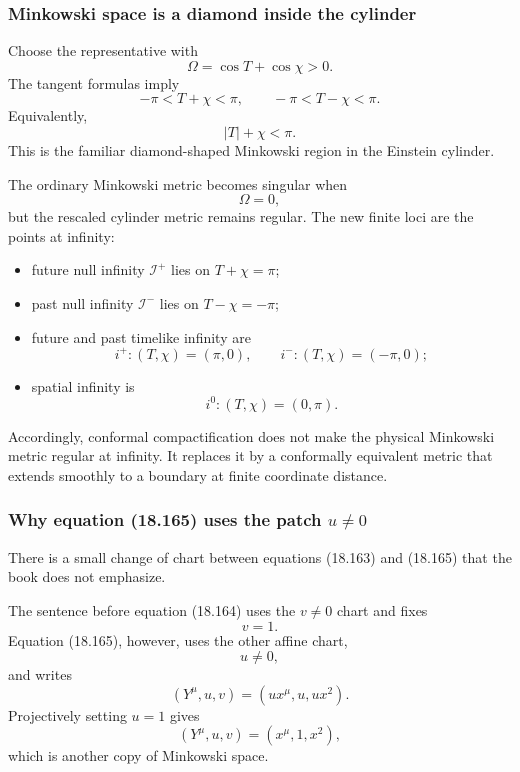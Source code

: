 \documentclass[
  10pt,
  a4paper,
  openany]{book}
\providecommand{\tightlist}{%
  \setlength{\itemsep}{0pt}\setlength{\parskip}{0pt}}
\begin{document}
\subsubsection{Minkowski space is a diamond inside the
cylinder}\label{minkowski-space-is-a-diamond-inside-the-cylinder}

Choose the representative with \[
\Omega=\cos T+\cos\chi>0.
\] The tangent formulas imply \[
-\pi<T+\chi<\pi,
\qquad
-\pi<T-\chi<\pi.
\] Equivalently, \[
\boxed{
|T|+\chi<\pi
}.
\] This is the familiar diamond-shaped Minkowski region in the Einstein
cylinder.

The ordinary Minkowski metric becomes singular when \[
\Omega=0,
\] but the rescaled cylinder metric remains regular. The new finite loci
are the points at infinity:

\begin{itemize}
\tightlist
\item
  future null infinity \(\mathscr I^+\) lies on \(T+\chi=\pi\);
\item
  past null infinity \(\mathscr I^-\) lies on \(T-\chi=-\pi\);
\item
  future and past timelike infinity are \[
  i^+:(T,\chi)=(\pi,0),
  \qquad
  i^-:(T,\chi)=(-\pi,0);
  \]
\item
  spatial infinity is \[
  i^0:(T,\chi)=(0,\pi).
  \]
\end{itemize}

Accordingly, conformal compactification does not make the physical
Minkowski metric regular at infinity. It replaces it by a conformally
equivalent metric that extends smoothly to a boundary at finite
coordinate distance.

\subsubsection{\texorpdfstring{Why equation (18.165) uses the patch
\(u\neq0\)}{Why equation (18.165) uses the patch u\textbackslash neq0}}\label{why-equation-18.165-uses-the-patch-uneq0}

There is a small change of chart between equations (18.163) and (18.165)
that the book does not emphasize.

The sentence before equation (18.164) uses the \(v\neq0\) chart and
fixes \[
v=1.
\] Equation (18.165), however, uses the other affine chart, \[
u\neq0,
\] and writes \[
\left(
Y^\mu,u,v
\right)
=
\left(
u x^\mu,u,ux^2
\right).
\] Projectively setting \(u=1\) gives \[
\left(
Y^\mu,u,v
\right)
=
\left(
x^\mu,1,x^2
\right),
\] which is another copy of Minkowski space.
\end{document}
